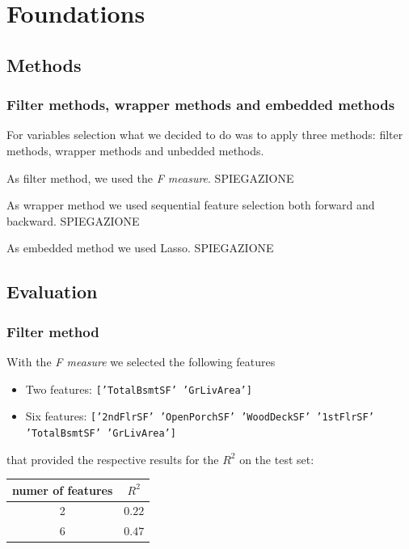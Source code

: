 \documentclass[a4paper,oneside,12pt]{article}
\begin{document}
\section{Foundations}

\subsection{Methods}

\subsubsection{Filter methods, wrapper methods and embedded methods}

For variables selection what we decided to do was to apply three methods: filter methods, wrapper methods and unbedded methods. 

As filter method, we used the \textit{F measure}. SPIEGAZIONE

As wrapper method we used sequential feature selection both forward and backward. SPIEGAZIONE

As embedded method we used Lasso. SPIEGAZIONE

\subsection{Evaluation}

\subsubsection{Filter method}

With the \textit{F measure} we selected the following features 

\begin{itemize}
\item Two features: \texttt{['TotalBsmtSF' 'GrLivArea']} 
\item Six features:  \texttt{['2ndFlrSF' 'OpenPorchSF' 'WoodDeckSF' '1stFlrSF' 'TotalBsmtSF' 'GrLivArea']}
\end{itemize}

that provided the respective results for the $R^2$ on the test set:
\begin{table}[H]
\centering
\begin{tabular}{|c|c|}
\hline
numer of features & $R^2$ \\
\hline
2  & $0.22$ \\
\hline
6  & $0.47$ \\
\hline

\end{tabular}
\end{table}
\end{document}
